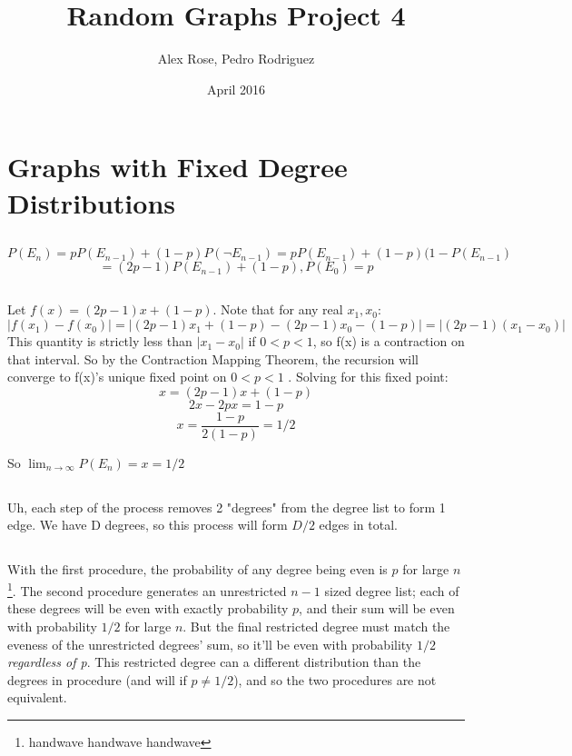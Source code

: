 \documentclass{article}
\title{Random Graphs Project 4}
\author{Alex Rose, Pedro Rodriguez}
\date{April 2016}
\begin{document}
\maketitle

\section{ Graphs with Fixed Degree Distributions}

\subsection{ }

$$P(E_n) = pP(E_{n-1}) + (1-p)P(\neg E_{n-1}) = pP(E_{n-1}) + (1-p)(1- P(E_{n-1}) $$
$$ = (2p-1)P(E_{n-1}) + (1 - p), P(E_0) = p$$

\subsection{} 
Let $f(x) = (2p -1)x + (1-p)$. Note that for any real $x_1,x_0$:
$$|f(x_1) - f(x_0)| = |(2p-1)x_1 + (1-p) - (2p-1)x_0 - (1-p)| = |(2p-1)(x_1-x_0)|$$
This quantity is strictly less than $|x_1-x_0|$ if $0 < p < 1$, so f(x) is a contraction on that interval. So by the Contraction Mapping Theorem, the recursion will converge to f(x)'s unique fixed point on $0 < p < 1$ .  Solving for this fixed point:
$$x = (2p-1)x + (1-p)$$
$$2x - 2px = 1-p$$
$$x = \frac{1-p}{2(1-p)} = 1/2$$

So $\lim_{n\to\infty} P(E_{n})= x = 1/2$

\subsection{}
Uh, each step of the process removes 2 "degrees" from the degree list to form 1 edge. We have D degrees, so this process will form $D/2$ edges in total.

\subsection{}
With the first procedure, the probability of any degree being even is $p$ for large $n$ \footnote{handwave handwave handwave}. The second procedure generates an unrestricted $n-1$ sized degree list; each of these degrees will be even with exactly probability $p$, and their sum will be even with probability $1/2$ for large $n$. But the final restricted degree must match the eveness of the unrestricted degrees' sum, so it'll be even with probability $1/2$ \textit{regardless of p}. This restricted degree can a different distribution than the degrees in procedure (and will if $p \ne 1/2$), and so the two procedures are not equivalent.
\end{document}

